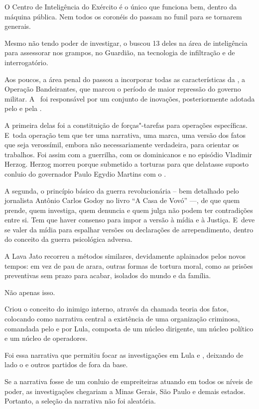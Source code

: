 O Centro de Inteligência do Exército é o único que funciona bem, dentro
da máquina pública. Nem todos os coronéis do  passam no funil para
se tornarem generais.

Mesmo não tendo poder de investigar, o  buscou 13 deles na área de
inteligência para assessorar nos grampos, no Guardião, na tecnologia de
infiltração e de interrogatório.

Aos poucos, a área penal do  passou a incorporar todas as
características da , a Operação Bandeirantes, que marcou o período
de maior repressão do governo militar. A~ foi responsável por um
conjunto de inovações, posteriormente adotada pelo  e pela .

A primeira delas foi a constituição de forças"-tarefas para operações
específicas. E~toda operação tem que ter uma narrativa, uma marca, uma
versão dos fatos que seja verossímil, embora não necessariamente
verdadeira, para orientar os trabalhos. Foi assim com a guerrilha, com
os dominicanos e no episódio Vladimir Herzog. Herzog morreu porque
submetido a torturas para que delatasse suposto conluio do governador
Paulo Egydio Martins com o .

A segunda, o princípio básico da guerra revolucionária -- bem detalhado
pelo jornalista Antônio Carlos Godoy no livro ``A Casa de Vovó'' \mbox{---,} de
que quem prende, quem investiga, quem denuncia e quem julga não podem
ter contradições entre si. Tem que haver consenso para impor a versão à
mídia e à Justiça. E~deve se valer da mídia para espalhar versões ou
declarações de arrependimento, dentro do conceito da guerra psicológica
adversa.

A Lava Jato recorreu a métodos similares, devidamente aplainados pelos
novos tempos: em vez de pau de arara, outras formas de tortura moral,
como as prisões preventivas sem prazo para acabar, isolados do mundo e
da família.

Não apenas isso.

Criou o conceito do inimigo interno, através da chamada teoria dos
fatos, colocando como narrativa central a existência de uma organização
criminosa, comandada pelo  e por Lula, composta de um núcleo
dirigente, um núcleo político e um núcleo de operadores.

Foi essa narrativa que permitiu focar as investigações em Lula e ,
deixando de lado o  e outros partidos de fora da base.

Se a narrativa fosse de um conluio de empreiteiras atuando em todos os
níveis de poder, as investigações chegariam a Minas Gerais, São Paulo e
demais estados. Portanto, a seleção da narrativa não foi aleatória.

